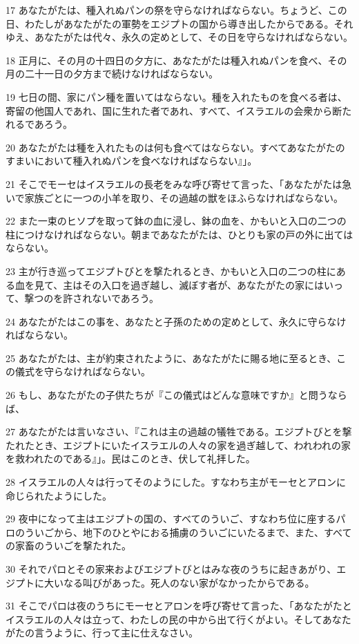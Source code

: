 \par 17 あなたがたは、種入れぬパンの祭を守らなければならない。ちょうど、この日、わたしがあなたがたの軍勢をエジプトの国から導き出したからである。それゆえ、あなたがたは代々、永久の定めとして、その日を守らなければならない。
\par 18 正月に、その月の十四日の夕方に、あなたがたは種入れぬパンを食べ、その月の二十一日の夕方まで続けなければならない。
\par 19 七日の間、家にパン種を置いてはならない。種を入れたものを食べる者は、寄留の他国人であれ、国に生れた者であれ、すべて、イスラエルの会衆から断たれるであろう。
\par 20 あなたがたは種を入れたものは何も食べてはならない。すべてあなたがたのすまいにおいて種入れぬパンを食べなければならない』」。
\par 21 そこでモーセはイスラエルの長老をみな呼び寄せて言った、「あなたがたは急いで家族ごとに一つの小羊を取り、その過越の獣をほふらなければならない。
\par 22 また一束のヒソプを取って鉢の血に浸し、鉢の血を、かもいと入口の二つの柱につけなければならない。朝まであなたがたは、ひとりも家の戸の外に出てはならない。
\par 23 主が行き巡ってエジプトびとを撃たれるとき、かもいと入口の二つの柱にある血を見て、主はその入口を過ぎ越し、滅ぼす者が、あなたがたの家にはいって、撃つのを許されないであろう。
\par 24 あなたがたはこの事を、あなたと子孫のための定めとして、永久に守らなければならない。
\par 25 あなたがたは、主が約束されたように、あなたがたに賜る地に至るとき、この儀式を守らなければならない。
\par 26 もし、あなたがたの子供たちが『この儀式はどんな意味ですか』と問うならば、
\par 27 あなたがたは言いなさい、『これは主の過越の犠牲である。エジプトびとを撃たれたとき、エジプトにいたイスラエルの人々の家を過ぎ越して、われわれの家を救われたのである』」。民はこのとき、伏して礼拝した。
\par 28 イスラエルの人々は行ってそのようにした。すなわち主がモーセとアロンに命じられたようにした。
\par 29 夜中になって主はエジプトの国の、すべてのういご、すなわち位に座するパロのういごから、地下のひとやにおる捕虜のういごにいたるまで、また、すべての家畜のういごを撃たれた。
\par 30 それでパロとその家来およびエジプトびとはみな夜のうちに起きあがり、エジプトに大いなる叫びがあった。死人のない家がなかったからである。
\par 31 そこでパロは夜のうちにモーセとアロンを呼び寄せて言った、「あなたがたとイスラエルの人々は立って、わたしの民の中から出て行くがよい。そしてあなたがたの言うように、行って主に仕えなさい。
